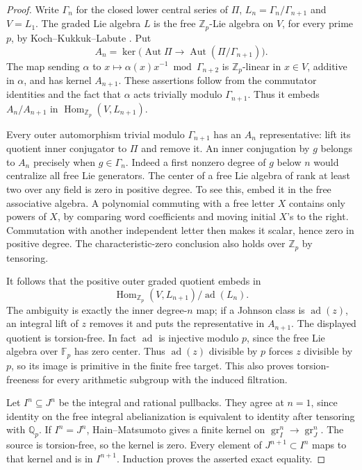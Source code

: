 \documentclass[11pt,a4paper]{article}
\theoremstyle{definition}
\begin{document}
\begin{proof}
Write $\Gamma_n$ for the closed lower central series of $\Pi$,
$L_n=\Gamma_n/\Gamma_{n+1}$ and $V=L_1$. The graded Lie algebra
$L$ is the free $\mathbb Z_p$-Lie algebra on $V$, for every prime
$p$, by Koch--Kukkuk--Labute \cite[Theorem~2.1, pp.~48--49;
author PDF pp.~4--5]{KochKukkukLabute1998}.
Put
\[
 A_n=\ker\bigl(\operatorname{Aut}\Pi\longrightarrow
                    \operatorname{Aut}(\Pi/\Gamma_{n+1})\bigr).
\]
The map sending $\alpha$ to
$x\mapsto\alpha(x)x^{-1}\bmod\Gamma_{n+2}$ is
$\mathbb Z_p$-linear in $x\in V$, additive in $\alpha$, and has
kernel $A_{n+1}$. These assertions follow from the commutator
identities and the fact that $\alpha$ acts trivially modulo
$\Gamma_{n+1}$. Thus it embeds $A_n/A_{n+1}$ in
$\operatorname{Hom}_{\mathbb Z_p}(V,L_{n+1})$.

Every outer automorphism trivial modulo $\Gamma_{n+1}$ has an
$A_n$ representative: lift its quotient inner conjugator to
$\Pi$ and remove it. An inner conjugation by $g$ belongs to
$A_n$ precisely when $g\in\Gamma_n$. Indeed a first nonzero
degree of $g$ below $n$ would centralize all free Lie generators.
The center of a free Lie algebra of rank at least two over any
field is zero in positive degree. To see this, embed it in the
free associative algebra. A polynomial commuting with a free
letter $X$ contains only powers of $X$, by comparing word
coefficients and moving initial $X$'s to the right. Commutation
with another independent letter then makes it scalar, hence zero
in positive degree. The characteristic-zero conclusion also
holds over $\mathbb Z_p$ by tensoring.

It follows that the positive outer graded quotient embeds in
\[
 \operatorname{Hom}_{\mathbb Z_p}(V,L_{n+1})/\operatorname{ad}(L_n).
\]
The ambiguity is exactly the inner degree-$n$ map; if a Johnson
class is $\operatorname{ad}(z)$, an integral lift of $z$ removes
it and puts the representative in $A_{n+1}$. The displayed
quotient is torsion-free. In fact $\operatorname{ad}$ is injective
modulo $p$, since the free Lie algebra over $\mathbb F_p$ has zero
center. Thus $\operatorname{ad}(z)$ divisible by $p$ forces $z$
divisible by $p$, so its image is primitive in the finite free
target. This also proves torsion-freeness for every arithmetic
subgroup with the induced filtration.

Let $I^n\subseteq J^n$ be the integral and rational pullbacks.
They agree at $n=1$, since identity on the free integral
abelianization is equivalent to identity after tensoring with
$\mathbb Q_p$. If $I^n=J^n$, Hain--Matsumoto
\cite[Proposition~8.2, p.~25]{HainMatsumoto2001} gives a finite
kernel on $\operatorname{gr}_I^n\to\operatorname{gr}_J^n$.
The source is torsion-free, so the kernel is zero. Every element
of $J^{n+1}\subset I^n$ maps to that kernel and is in $I^{n+1}$.
Induction proves the asserted exact equality.
\end{proof}
\end{document}
